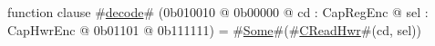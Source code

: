 function clause #\hyperref[zdecode]{decode}# (0b010010 @ 0b00000 @ cd : CapRegEnc @ sel : CapHwrEnc @   0b01101 @ 0b111111) = #\hyperref[zSome]{Some}#(#\hyperref[zCReadHwr]{CReadHwr}#(cd, sel))

